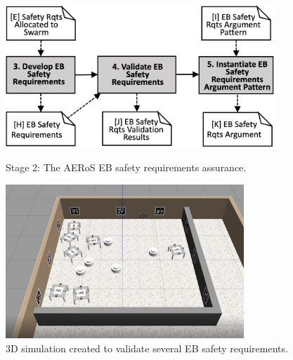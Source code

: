 \documentclass[runningheads]{llncs}
\begin{document}
\begin{figure}[!t]
	\centering
	\begin{minipage}{.57\textwidth}
		\centering
		\includegraphics[width=0.9\textwidth]{figures/AERoS-Stage2.png}%
		\vspace{-2ex}
		\caption{Stage 2: The AERoS EB safety \newline requirements assurance.}%
	\label{amlas-a-stage2}
\end{minipage}%
\begin{minipage}{.43\textwidth}
	\centering
	\includegraphics[trim={30mm 25mm 45mm 30mm},clip,width=0.8\textwidth]{figures/3Dsim.png}
	\vspace{-2ex}
	\caption{3D simulation created to \newline validate several EB safety requirements.}
	\label{3Dsim}
\end{minipage}
\vspace{-4ex}
\end{figure}
\end{document}
